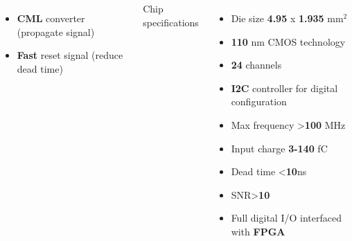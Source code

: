 \documentclass[aspectratio=169]{beamer}
\begin{document}
\begin{frame}
\begin{columns}
\begin{columns}
{\begin{itemize}
				\item \textbf{CML} converter (propagate signal)
				\item \textbf{Fast} reset signal (reduce dead time)
			\end{itemize} }
			{\color{blue} Chip specifications }
			\begin{itemize}
				\item Die size \textbf{4.95 }x \textbf{1.935} mm$^2$
				\item \textbf{110} nm CMOS technology
				\item \textbf{24} channels
				\item \textbf{I2C} controller for digital configuration
				\item Max frequency >\textbf{100} MHz
				\item Input charge \textbf{3-140} fC
				\item Dead time <\textbf{10}ns
				\item SNR>\textbf{10}
				\item Full digital I/O interfaced \\ with \textbf{FPGA}
			\end{itemize}
		\end{columns}
	\end{columns}
	\end{frame}

		
\end{document}
